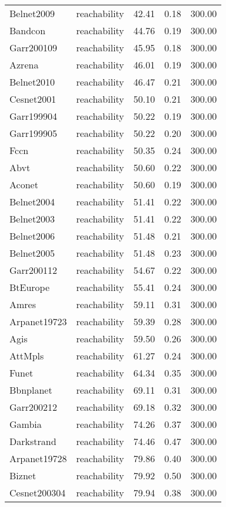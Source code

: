 \begin{tabular}{llrrr}
Belnet2009 & reachability & 42.41 & 0.18 & 300.00 \\
Bandcon & reachability & 44.76 & 0.19 & 300.00 \\
Garr200109 & reachability & 45.95 & 0.18 & 300.00 \\
Azrena & reachability & 46.01 & 0.19 & 300.00 \\
Belnet2010 & reachability & 46.47 & 0.21 & 300.00 \\
Cesnet2001 & reachability & 50.10 & 0.21 & 300.00 \\
Garr199904 & reachability & 50.22 & 0.19 & 300.00 \\
Garr199905 & reachability & 50.22 & 0.20 & 300.00 \\
Fccn & reachability & 50.35 & 0.24 & 300.00 \\
Abvt & reachability & 50.60 & 0.22 & 300.00 \\
Aconet & reachability & 50.60 & 0.19 & 300.00 \\
Belnet2004 & reachability & 51.41 & 0.22 & 300.00 \\
Belnet2003 & reachability & 51.41 & 0.22 & 300.00 \\
Belnet2006 & reachability & 51.48 & 0.21 & 300.00 \\
Belnet2005 & reachability & 51.48 & 0.23 & 300.00 \\
Garr200112 & reachability & 54.67 & 0.22 & 300.00 \\
BtEurope & reachability & 55.41 & 0.24 & 300.00 \\
Amres & reachability & 59.11 & 0.31 & 300.00 \\
Arpanet19723 & reachability & 59.39 & 0.28 & 300.00 \\
Agis & reachability & 59.50 & 0.26 & 300.00 \\
AttMpls & reachability & 61.27 & 0.24 & 300.00 \\
Funet & reachability & 64.34 & 0.35 & 300.00 \\
Bbnplanet & reachability & 69.11 & 0.31 & 300.00 \\
Garr200212 & reachability & 69.18 & 0.32 & 300.00 \\
Gambia & reachability & 74.26 & 0.37 & 300.00 \\
Darkstrand & reachability & 74.46 & 0.47 & 300.00 \\
Arpanet19728 & reachability & 79.86 & 0.40 & 300.00 \\
Biznet & reachability & 79.92 & 0.50 & 300.00 \\
Cesnet200304 & reachability & 79.94 & 0.38 & 300.00 \\

\end{tabular}
